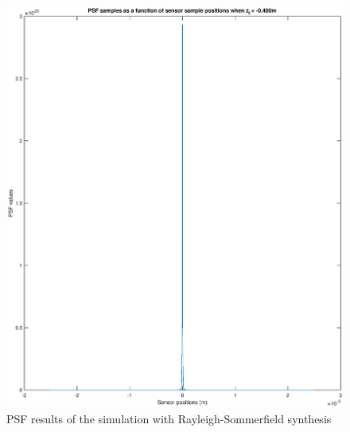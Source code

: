 \documentclass[12pt,a4paper,english
]{tunithesis}
\begin{document}
\begin{figure}
  \centering
  \includegraphics[width=\columnwidth]{img/psf_single_rs.eps}
  \caption{PSF results of the simulation with Rayleigh-Sommerfield synthesis}
  \label{fig:psf_single_rs}
\end{figure}
\end{document}
